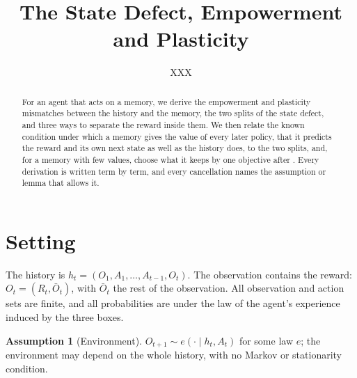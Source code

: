 \documentclass{article}
\title{The State Defect, Empowerment and Plasticity}
\author{XXX}
\theoremstyle{definition}
\newtheorem{assumption}{Assumption}
\theoremstyle{remark}
\newcommand{\Ob}{\bar O}
\begin{document}
\maketitle

\begin{abstract}
For an agent that acts on a memory, we derive the empowerment and plasticity mismatches between the history and the memory, the two splits of the state defect, and three ways to separate the reward inside them. We then relate the known condition under which a memory gives the value of every later policy, that it predicts the reward and its own next state as well as the history does, to the two splits, and, for a memory with few values, choose what it keeps by one objective after \citet{still2012information}. Every derivation is written term by term, and every cancellation names the assumption or lemma that allows it.
\end{abstract}

\section{Setting}\label{sec:setting}

\begin{center}
\end{center}

The history is $h_t=(O_1,A_1,\dots,A_{t-1},O_t)$. The observation contains the reward: $O_t=(R_t,\Ob_t)$, with $\Ob_t$ the rest of the observation. All observation and action sets are finite, and all probabilities are under the law of the agent's experience induced by the three boxes.

\begin{assumption}[Environment]\label{as:env}
$O_{t+1}\sim e(\cdot\mid h_t,A_t)$ for some law $e$; the environment may depend on the whole history, with no Markov or stationarity condition.
\end{assumption}
\end{document}
